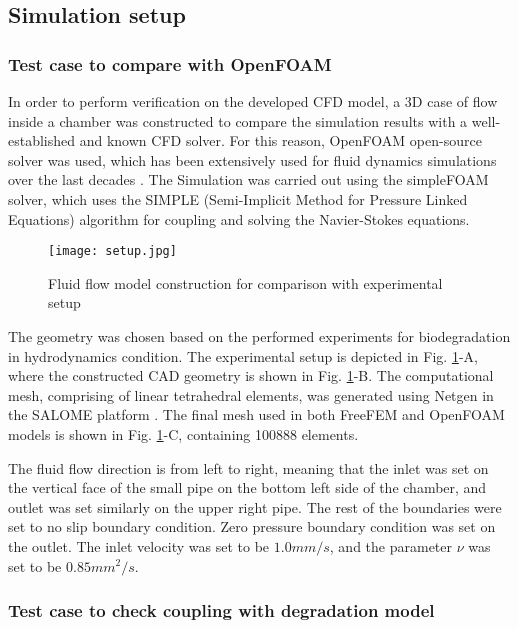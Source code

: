 \subsection{Simulation setup}

\subsubsection{Test case to compare with OpenFOAM}

In order to perform verification on the developed CFD model, a 3D case of flow inside a chamber was constructed to compare the simulation results with a well-established and known CFD solver. For this reason, OpenFOAM open-source solver was used, which has been extensively used for fluid dynamics simulations over the last decades \cite{Weller1998}. The Simulation was carried out using the simpleFOAM solver, which uses the SIMPLE (Semi-Implicit Method for Pressure Linked Equations) algorithm for coupling and solving the Navier-Stokes equations.

\begin{figure}[h]
\centering
\medskip
\texttt{[image: setup.jpg]}
\caption[Fluid flow model construction for comparison with experimental setup]{Fluid flow model construction for comparison with experimental setup} \label{fig:fluid_setup}
\end{figure}

The geometry was chosen based on the performed experiments for biodegradation in hydrodynamics condition. The experimental setup is depicted in Fig. \ref{fig:fluid_setup}-A, where the constructed CAD geometry is shown in Fig. \ref{fig:fluid_setup}-B. The computational mesh, comprising of linear tetrahedral elements, was generated using Netgen \cite{Schoeberl1997} in the SALOME platform \cite{Ribes2007}. The final mesh used in both FreeFEM and OpenFOAM models is shown in Fig. \ref{fig:fluid_setup}-C, containing \num{100888} elements.

The fluid flow direction is from left to right, meaning that the inlet was set on the vertical face of the small pipe on the bottom left side of the chamber, and outlet was set similarly on the upper right pipe. The rest of the boundaries were set to no slip boundary condition. Zero pressure boundary condition was set on the outlet. The inlet velocity was set to be $1.0 mm/s$, and the parameter $\nu$ was set to be $0.85 mm^2/s$. 

\subsubsection{Test case to check coupling with degradation model}

